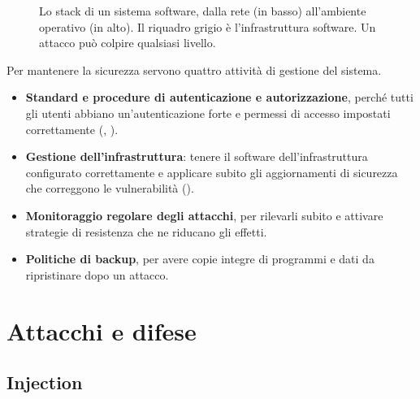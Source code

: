\begin{figure}[ht]
\centering
{}
\caption{Lo stack di un sistema software, dalla rete (in basso) all'ambiente operativo (in alto). Il riquadro grigio
è l'infrastruttura software. Un attacco può colpire qualsiasi livello.}
\label{fig:sic-stack}
\end{figure}

Per mantenere la sicurezza servono quattro attività di gestione del sistema.
\begin{itemize}
  \item \textbf{Standard e procedure di autenticazione e autorizzazione}, perché tutti gli utenti abbiano
    un'autenticazione forte e permessi di accesso impostati correttamente (,
    ).
  \item \textbf{Gestione dell'infrastruttura}: tenere il software dell'infrastruttura configurato correttamente e
    applicare subito gli aggiornamenti di sicurezza che correggono le vulnerabilità ().
  \item \textbf{Monitoraggio regolare degli attacchi}, per rilevarli subito e attivare strategie di resistenza che ne
    riducano gli effetti.
  \item \textbf{Politiche di backup}, per avere copie integre di programmi e dati da ripristinare dopo un attacco.
\end{itemize}

\section{Attacchi e difese}
\label{sec:sic-attacchi}

\subsection{Injection}
\label{sec:sic-injection}

